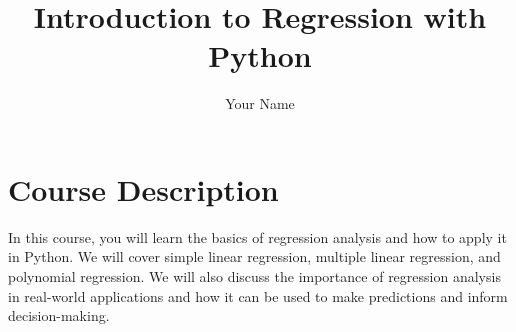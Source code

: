\documentclass[12pt]{article}
\begin{document}
\title{Introduction to Regression with Python}
\author{Your Name}
\date{}

\maketitle

\section{Course Description}
In this course, you will learn the basics of regression analysis and how to apply it in Python. We will cover simple linear regression, multiple linear regression, and polynomial regression. We will also discuss the importance of regression analysis in real-world applications and how it can be used to make predictions and inform decision-making.
\end{document}
